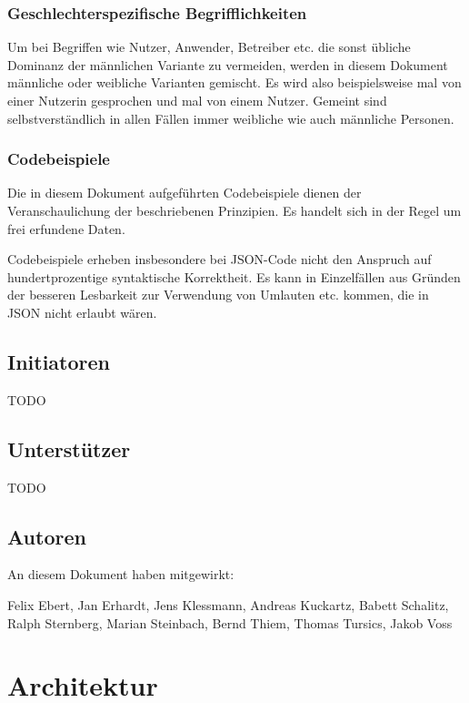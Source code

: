 \documentclass[,a4paper]{article}
\begin{document}
\subsubsection{Geschlechterspezifische
Begrifflichkeiten}\label{geschlechterspezifische-begrifflichkeiten}

Um bei Begriffen wie Nutzer, Anwender, Betreiber etc. die sonst übliche
Dominanz der männlichen Variante zu vermeiden, werden in diesem Dokument
männliche oder weibliche Varianten gemischt. Es wird also beispielsweise
mal von einer Nutzerin gesprochen und mal von einem Nutzer. Gemeint sind
selbstverständlich in allen Fällen immer weibliche wie auch männliche
Personen.

\subsubsection{Codebeispiele}\label{codebeispiele}

Die in diesem Dokument aufgeführten Codebeispiele dienen der
Veranschaulichung der beschriebenen Prinzipien. Es handelt sich in der
Regel um frei erfundene Daten.

Codebeispiele erheben insbesondere bei JSON-Code nicht den Anspruch auf
hundertprozentige syntaktische Korrektheit. Es kann in Einzelfällen aus
Gründen der besseren Lesbarkeit zur Verwendung von Umlauten etc. kommen,
die in JSON nicht erlaubt wären.

\subsection{Initiatoren}\label{initiatoren}

TODO

\subsection{Unterstützer}\label{unterstuxfctzer}

TODO

\subsection{Autoren}\label{autoren}

An diesem Dokument haben mitgewirkt:

Felix Ebert, Jan Erhardt, Jens Klessmann, Andreas Kuckartz, Babett
Schalitz, Ralph Sternberg, Marian Steinbach, Bernd Thiem, Thomas
Tursics, Jakob Voss

\section{Architektur}\label{architektur}
\end{document}
